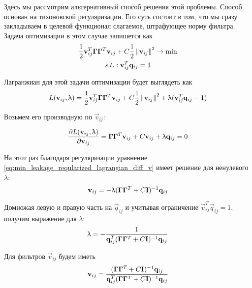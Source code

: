 Здесь мы рассмотрим альтернативный способ решения этой проблемы.  Способ основан на тихоновской
регуляризации. Его суть состоит в том, что мы сразу закладываем в целевой функционал слагаемое,
штрафующее норму фильтра. Задача оптимизации в этом случае запишется как
\begin{gather}
    \frac{1}{2} \mathbf{v}_{ij}^T \mathbf{\Gamma} \mathbf{\Gamma}^T\mathbf{v}_{ij}  + C \frac{1}{2} \left\lVert\mathbf{v}_{ij}\right\rVert^2 \rightarrow \min\\
    s.t.: \mathbf{v}_{ij}^T \mathbf{q}_{ij} = 1
    \label{eq:min_leakage_objective_kron_regularized}
\end{gather}

Лагранжиан для этой задачи оптимизации будет выглядеть как
\begin{equation}
    L(\mathbf{v}_{ij}, \uplambda) =
    \frac{1}{2} \mathbf{v}_{ij}^T \mathbf{\Gamma} \mathbf{\Gamma}^T\mathbf{v}_{ij}  + C \frac{1}{2} \left\lVert\mathbf{v}_{ij}\right\rVert^2 + \uplambda(\mathbf{v}_{ij}^T \mathbf{q}_{ij} - 1)
    \label{eq:min_leakage_regularized_lagrangian}
\end{equation}

Возьмем его производную по $\vec{v}_{ij}$:

\begin{equation}
    \frac{\partial L(\mathbf{v}_{ij}, \uplambda)}{\partial \mathbf{v}_{ij}} =
    \mathbf{\Gamma} \mathbf{\Gamma}^T\mathbf{v}_{ij} + C\mathbf{v}_{ij} + \uplambda \mathbf{q}_{ij} = 0
    \label{eq:min_leakage_reqularized_lagrangian_diff_v}
\end{equation}

На этот раз благодаря регуляризации уравнение \ref{eq:min_leakage_reqularized_lagrangian_diff_v} имеет решение для
ненулевого $\lambda$:
\begin{equation}
    \mathbf{v}_{ij} = -\uplambda (\mathbf{\Gamma} \mathbf{\Gamma}^T + C\mathbf{I})^{-1}\mathbf{q}_{ij}
\end{equation}

Домножая левую и правую часть на $\vec{q}_{ij}$ и учитывая ограничение
$\vec{v}_{ij}^T\vec{q}_{ij} = 1$, получим выражение для $\lambda$:
\begin{equation}
    \uplambda = - \frac{1}{\mathbf{q}_{ij}^T(\mathbf{\Gamma}\mathbf{\Gamma}^T + C\mathbf{I})^{-1}\mathbf{q}_{ij}} 
\end{equation}

Для фильтров $\vec{v}_{ij}$ будем иметь
\begin{equation}
    \mathbf{v}_{ij} = \frac{(\mathbf{\Gamma}\mathbf{\Gamma}^T + C\mathbf{I})^{-1}\mathbf{q}_{ij}}{\mathbf{q}_{ij}^T(\mathbf{\Gamma}\mathbf{\Gamma}^T + C\mathbf{I})^{-1}\mathbf{q}_{ij}} 
\end{equation}

